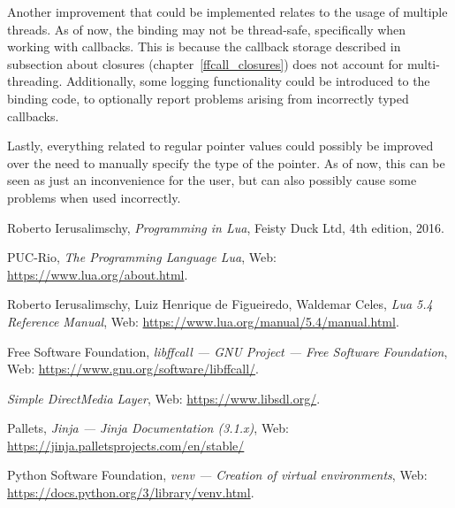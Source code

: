 \documentclass[polish, english]{iithesis}
\begin{document}
    Another improvement that could be implemented relates to the usage of multiple threads.
    As of now, the binding may not be thread-safe, specifically when working with callbacks.
    This is because the callback storage described in subsection about closures (chapter~\ref{ffcall_closures}) does not account for multi-threading.
    Additionally, some logging functionality could be introduced to the binding code, to optionally report problems arising from incorrectly typed callbacks.

    Lastly, everything related to regular pointer values could possibly be improved over the need to manually specify the type of the pointer.
    As of now, this can be seen as just an inconvenience for the user, but can also possibly cause some problems when used incorrectly.

\begin{thebibliography}{42}
    Roberto Ierusalimschy,
    \emph{Programming in Lua},
    Feisty Duck Ltd,
    4th edition,
    2016.

    PUC-Rio,
    \emph{The Programming Language Lua},
    Web: \url{https://www.lua.org/about.html}.

    Roberto Ierusalimschy, 
    Luiz Henrique de Figueiredo,
    Waldemar Celes,
    \emph{Lua 5.4 Reference Manual},
    Web: \url{https://www.lua.org/manual/5.4/manual.html}.

    Free Software Foundation,
    \emph{libffcall --- GNU Project --- Free Software Foundation},
    Web: \url{https://www.gnu.org/software/libffcall/}.

    \emph{Simple DirectMedia Layer},
    Web: \url{https://www.libsdl.org/}.

    Pallets,
    \emph{Jinja --- Jinja Documentation (3.1.x)},
    Web: \url{https://jinja.palletsprojects.com/en/stable/}

    Python Software Foundation,
    \emph{venv --- Creation of virtual environments},
    Web: \url{https://docs.python.org/3/library/venv.html}.
\end{thebibliography}
\end{document}
